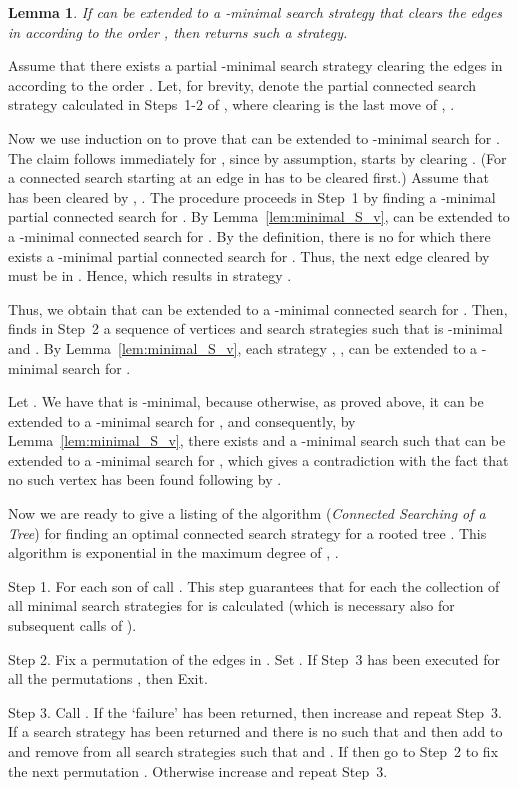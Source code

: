 \documentclass[10pt]{article}
\newenvironment{proof}[1][Proof]
{\par\noindent{\bf #1:} }{\hspace*{\fill}\nolinebreak{}\bigskip\par}
\newtheorem{lemma}{Lemma}
\begin{document}
\begin{lemma} \label{lem:FindMinimal_works}
If  can be extended to a -minimal search strategy that clears the edges in  according to the order , then  returns such a strategy.
\end{lemma}
\begin{proof}
Assume that there exists a partial -minimal search strategy  clearing the edges in  according to the order . Let, for brevity,  denote the partial connected search strategy calculated in Steps~1-2 of , where clearing  is the last move of , .

Now we use induction on  to prove that  can be extended to -minimal search for . The claim follows immediately for , since by assumption,  starts by clearing . (For a connected search starting at  an edge in  has to be cleared first.) Assume that  has been cleared by , . The procedure  proceeds in Step~1 by finding a -minimal partial connected search  for . By Lemma~\ref{lem:minimal_S_v},  can be extended to a -minimal connected search for . By the definition, there is no  for which there exists a -minimal partial connected search for . Thus, the next edge  cleared by  must be in . Hence,  which results in strategy .

Thus, we obtain that  can be extended to a -minimal connected search for . Then,  finds in Step~2 a sequence of vertices  and search strategies  such that  is -minimal and . By Lemma~\ref{lem:minimal_S_v}, each strategy , , can be extended to a -minimal search for .

Let . We have that  is -minimal, because otherwise, as proved above, it can be extended to a -minimal search for , and consequently, by Lemma~\ref{lem:minimal_S_v}, there exists  and a -minimal search  such that  can be extended to a -minimal search for , which gives a contradiction with the fact that no such vertex has been found following  by .
\end{proof}


Now we are ready to give a listing of the algorithm  (\emph{Connected Searching of a Tree}) for finding an optimal connected search strategy for a rooted tree . This algorithm is exponential in the maximum degree of , .

\begin{list}{}{}
\item[Step 1.] For each son  of  call . This step guarantees that for each  the collection  of all minimal search strategies for  is calculated (which is necessary also for subsequent calls of ).
\item[Step 2.] Fix a permutation  of the edges in . Set . If Step~3 has been executed for all the  permutations , then Exit.
\item[Step 3.] Call . If the `failure' has been returned, then increase  and repeat Step~3. If a search strategy  has been returned and there is no  such that  and  then add  to  and remove from  all search strategies  such that  and . If  then go to Step~2 to fix the next permutation . Otherwise increase  and repeat Step~3.
\end{list}
\end{document}
